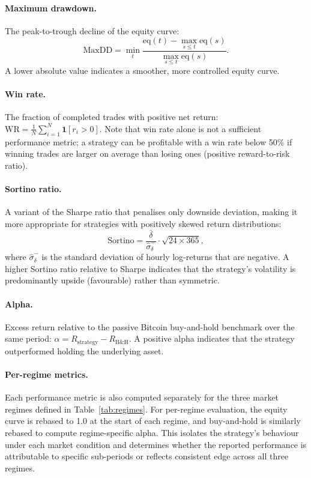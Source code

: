\paragraph{Maximum drawdown.}
The peak-to-trough decline of the equity curve:
\begin{equation}
    \text{MaxDD} = \min_{t} \frac{\text{eq}(t) - \max_{s \leq t} \text{eq}(s)}{\max_{s \leq t} \text{eq}(s)}.
\end{equation}
A lower absolute value indicates a smoother, more controlled equity curve.

\paragraph{Win rate.}
The fraction of completed trades with positive net return:
$\text{WR} = \frac{1}{N}\sum_{i=1}^{N} \mathbf{1}[r_i > 0]$.
Note that win rate alone is not a sufficient performance metric; a strategy can be profitable with a win rate below 50\% if winning trades are larger on average than losing ones (positive reward-to-risk ratio).

\paragraph{Sortino ratio.}
A variant of the Sharpe ratio that penalises only downside deviation, making it more appropriate for strategies with positively skewed return distributions:
\begin{equation}
    \text{Sortino} = \frac{\bar{\delta}}{\hat{\sigma}_{\delta}^{-}} \cdot \sqrt{24 \times 365},
\end{equation}
where $\hat{\sigma}_{\delta}^{-}$ is the standard deviation of hourly log-returns that are negative. A higher Sortino ratio relative to Sharpe indicates that the strategy's volatility is predominantly upside (favourable) rather than symmetric.

\paragraph{Alpha.}
Excess return relative to the passive Bitcoin buy-and-hold benchmark over the same period:
$\alpha = R_{\text{strategy}} - R_{\text{B\&H}}$.
A positive alpha indicates that the strategy outperformed holding the underlying asset.

\paragraph{Per-regime metrics.}
Each performance metric is also computed separately for the three market regimes defined in Table~\ref{tab:regimes}. For per-regime evaluation, the equity curve is rebased to 1.0 at the start of each regime, and buy-and-hold is similarly rebased to compute regime-specific alpha. This isolates the strategy's behaviour under each market condition and determines whether the reported performance is attributable to specific sub-periods or reflects consistent edge across all three regimes.

